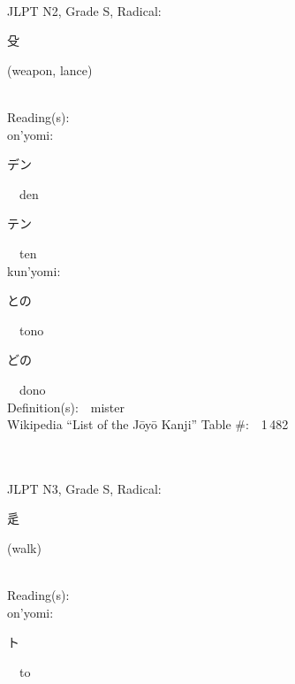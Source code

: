 \begin{multicols}{2}
{\fontsize{34pt}{40pt}  }\ \ \\  %
{JLPT N2, Grade S, Radical:\ \ {\begin{CJK}{UTF8}{min} 殳 \end{CJK}} (weapon, lance) } \\
Reading(s):\ \ \\
{\hspace*{1em}}on'yomi:\ \ \\
{\hspace*{2em}}{\begin{CJK}{UTF8}{min} デン \end{CJK}}\ \ den\ \ \\
{\hspace*{2em}}{\begin{CJK}{UTF8}{min} テン \end{CJK}}\ \ ten\ \ \\
{\hspace*{1em}}kun'yomi:\ \ \\
{\hspace*{2em}}{\begin{CJK}{UTF8}{min} との \end{CJK}}\ \ tono\ \ \\
{\hspace*{2em}}{\begin{CJK}{UTF8}{min} どの \end{CJK}}\ \ dono\ \ \\
Definition(s):\ \ mister \\
Wikipedia ``List of the J\=oy\=o Kanji'' Table \#:\ \ 1\,482 \\
\ \ \\
{\fontsize{34pt}{40pt}  }\ \ \\  %
{JLPT N3, Grade S, Radical:\ \ {\begin{CJK}{UTF8}{min} 辵 \end{CJK}} (walk) } \\
Reading(s):\ \ \\
{\hspace*{1em}}on'yomi:\ \ \\
{\hspace*{2em}}{\begin{CJK}{UTF8}{min} ト \end{CJK}}\ \ to\ \ \\

\end{multicols}
